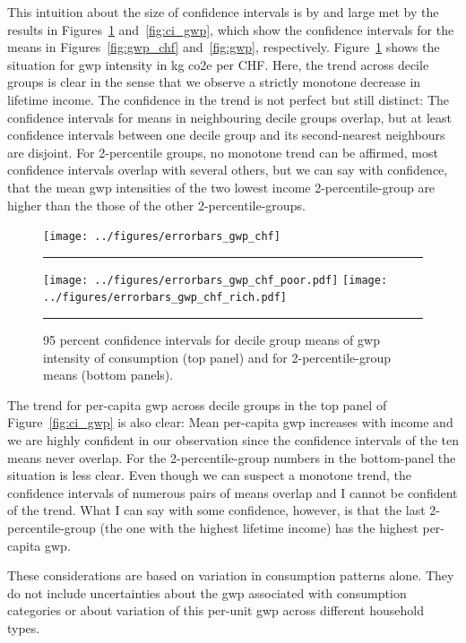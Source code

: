 \documentclass[a4paper,11pt,abstract=true]{scrartcl}
\begin{document}
This intuition about the size of confidence intervals is by and large met by the results in Figures~\ref{fig:ci_gwp_chf} and~\ref{fig:ci_gwp}, which show the confidence intervals for the means in Figures~\ref{fig:gwp_chf} and~\ref{fig:gwp}, respectively.
Figure~\ref{fig:ci_gwp_chf} shows the situation for \ac{gwp} intensity in kg \ac{co2e} per CHF.
Here, the trend across decile groups is clear in the sense that we observe a strictly monotone decrease in lifetime income.
The confidence in the trend is not perfect but still distinct:
The confidence intervals for means in neighbouring decile groups overlap, but at least confidence intervals between one decile group and its second-nearest neighbours are disjoint.
For 2-percentile groups, no monotone trend can be affirmed, most confidence intervals overlap with several others, but we can say with confidence, that the mean \ac{gwp} intensities of the two lowest income 2-percentile-group are higher than the those of the other 2-percentile-groups.

\begin{figure}[htp]
  \centering
  \texttt{[image: ../figures/errorbars\_gwp\_chf]}

  \rule{1.05cm}{0pt}\texttt{[image: ../figures/errorbars\_gwp\_chf\_poor.pdf]}
  \hfill
  \texttt{[image: ../figures/errorbars\_gwp\_chf\_rich.pdf]}\rule{1.05cm}{0pt}
  \caption[CI for mean \ac{gwp} intensity]{95 percent confidence intervals for decile group means of \ac{gwp} intensity of consumption (top panel) and for 2-percentile-group means (bottom panels).}
  \label{fig:ci_gwp_chf}
\end{figure}

The trend for per-capita \ac{gwp} across decile groups in the top panel of Figure~\ref{fig:ci_gwp} is also clear:
Mean per-capita \ac{gwp} increases with income and we are highly confident in our observation since the confidence intervals of the ten means never overlap.
For the 2-percentile-group numbers in the bottom-panel the situation is less clear.
Even though we can suspect a monotone trend, the confidence intervals of numerous pairs of means overlap and I cannot be confident of the trend.
What I can say with some confidence, however, is that the last 2-percentile-group (the one with the highest lifetime income) has the highest per-capita \ac{gwp}.

These considerations are based on variation in consumption patterns alone.
They do not include uncertainties about the \ac{gwp} associated with consumption categories or about variation of this per-unit \ac{gwp} across different household types.
\end{document}
